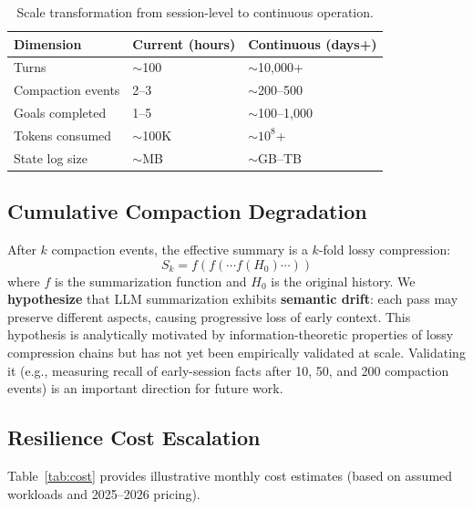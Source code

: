\documentclass{article}
\begin{document}
\begin{table}[h]
\centering
\caption{Scale transformation from session-level to continuous operation.}
\label{tab:scale}
\small
\begin{tabular}{lll}
\toprule
\textbf{Dimension} & \textbf{Current (hours)} & \textbf{Continuous (days+)} \\
\midrule
Turns & ${\sim}$100 & ${\sim}$10,000+ \\
Compaction events & 2--3 & ${\sim}$200--500 \\
Goals completed & 1--5 & ${\sim}$100--1,000 \\
Tokens consumed & ${\sim}$100K & ${\sim}10^{8}$+ \\
State log size & ${\sim}$MB & ${\sim}$GB--TB \\
\bottomrule
\end{tabular}
\end{table}

\subsection{Cumulative Compaction Degradation}

After $k$ compaction events, the effective summary is a $k$-fold lossy compression:
\begin{equation}
S_k = f(f(\cdots f(H_0) \cdots))
\end{equation}
where $f$ is the summarization function and $H_0$ is the original history. We \textbf{hypothesize} that LLM summarization exhibits \textbf{semantic drift}: each pass may preserve different aspects, causing progressive loss of early context. This hypothesis is analytically motivated by information-theoretic properties of lossy compression chains but has not yet been empirically validated at scale. Validating it (e.g., measuring recall of early-session facts after 10, 50, and 200 compaction events) is an important direction for future work.

\subsection{Resilience Cost Escalation}

Table~\ref{tab:cost} provides illustrative monthly cost estimates (based on assumed workloads and 2025--2026 pricing).
\end{document}
